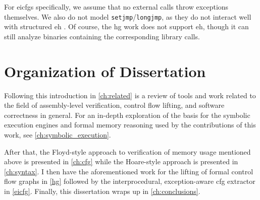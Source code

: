 For \acp{eicfg} specifically, we assume that no external calls throw exceptions themselves.
We also do not model \lstinline|setjmp|/\lstinline|longjmp|, as they do not interact well with structured \ac{eh} \autocite{using-setjmp-and-longjmp}.
Of course, the \ac{hg} work does not support \ac{eh}, though it can still analyze binaries containing the corresponding library calls.


\section{Organization of Dissertation}
Following this introduction in \cref{ch:related} is a review of tools and work related to the field of assembly-level verification, control flow lifting, and software correctness in general.
For an in-depth exploration of the basis for the symbolic execution engines and formal memory reasoning used by the contributions of this work,
see \cref{ch:symbolic_execution}.

After that, the Floyd-style approach to verification of memory usage mentioned above is presented in \cref{ch:cfg} while the Hoare-style approach is presented in \cref{ch:syntax}.
I then have the aforementioned work for the lifting of formal control flow graphs in \cref{hg}
followed by the interprocedural, exception-aware \ac{cfg} extractor in \cref{eicfg}.
Finally, this dissertation wraps up in \cref{ch:conclusions}.

